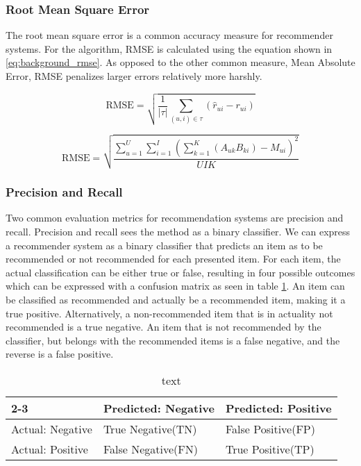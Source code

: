 \subsubsection{Root Mean Square Error}
The root mean square error is a common accuracy measure for recommender systems. For the algorithm, RMSE is calculated using the equation shown in \ref{eq:background_rmse}. As opposed to the other common measure, Mean Absolute Error, RMSE penalizes larger errors relatively more harshly.

\begin{equation} \label{eq:background_rmse}
\text{RMSE} = \sqrt{\frac{1}{|\tau|}\sum_{(u,i)\in \tau}(\hat{r}_{ui}-r_{ui})}
\end{equation}

\begin{equation}\label{eq:background_svd_rmse}
	\text{RMSE} = \sqrt{\frac{\sum_{u=1}^{U}\sum_{i=1}^{I}(\sum_{k=1}^{K}(A_{uk} B_{ki}) - M_{ui})^2}{UIK}}
\end{equation}

\subsubsection{Precision and Recall}
Two common evaluation metrics for recommendation systems are precision and recall. Precision and recall sees the method as a binary classifier. We can express a recommender system as a binary classifier that predicts an item as to be recommended or not recommended for each presented item. For each item, the actual classification can be either true or false, resulting in four possible outcomes which can be expressed with a confusion matrix as seen in table \ref{tab:testandevaluation_confusionmatrix}. An item can be classified as recommended and actually be a recommended item, making it a true positive. Alternatively, a non-recommended item that is in actuality not recommended is a true negative. An item that is not recommended by the classifier, but belongs with the recommended items is a false negative, and the reverse is a false positive.

\begin{table}[H]\label{tab:testandevaluation_confusionmatrix}
	\centering
	\begin{tabular}{ |l|l|l| }
		\toprule{2-3}
		& Predicted: Negative & Predicted: Positive \\ \hline
		Actual: Negative & True Negative(TN) & False Positive(FP) \\ \hline
		Actual: Positive & False Negative(FN) & True Positive(TP) \\ \hline
	\end{tabular}
	\caption{text}
\end{table}

